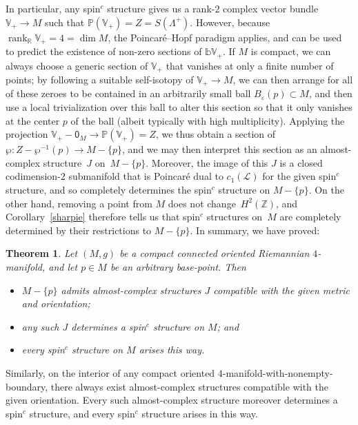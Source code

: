 \documentclass[pdftex]{sigma}
\numberwithin{equation}{section}
\newtheorem{Theorem}{Theorem}[section]
\def\ZZ{\mathbb{Z}}
\def\RR{\mathbb{R}}
\DeclareMathOperator{\rank}{rank}
\begin{document}
In particular, any spin$^c$ structure gives us a rank-$2$ complex vector bundle $\mathbb{V}_+\to M$ such that
$\mathbb{P} (\mathbb{V}_+)= Z = S (\Lambda^+)$. However, because $\rank_\RR \mathbb{V}_+= 4 = \dim M$,
the Poincar\'e--Hopf paradigm applies, and can be used to predict the existence of non-zero sections of $\mathbb{bV}_+$.
If $M$ is compact, we can always choose a generic section of $\mathbb{V}_+$ that vanishes at only a finite number of points;
by following a suitable self-isotopy of $\mathbb{V}_+\to M$,
we can then arrange for all of these zeroes to be contained in an arbitrarily small ball
$B_\varepsilon (p) \subset M$,
and then use a local trivialization over this ball to alter this section so that it only vanishes at the center $p$ of the ball
(albeit typically with high multiplicity). Applying the projection $\mathbb{V}_+- \mathsf{0}_M \to \mathbb{P} (\mathbb{V}_+)= Z$,
we thus obtain a section of $\wp\colon Z- \wp^{-1}(p) \to M -\{ p \}$, and we may then interpret this section as an almost-complex structure~$J$ on~$M -\{ p \}$. Moreover, the image of this $J$ is a closed codimension-$2$ submanifold that is Poincar\'e dual to $c_1(\mathscr{L})$
for the given spin$^c$ structure, and so completely determines the spin$^c$ structure on $M-\{ p \}$. On the other hand,
removing a point from $M$ does not change~$H^2(\ZZ)$, and Corollary~\ref{sharpie} therefore tells us that
spin$^c$ structures on~$M$ are completely determined by their restrictions to $M-\{ p \}$. In summary, we have proved:

\begin{Theorem}Let $(M, g)$ be a compact connected oriented Riemannian $4$-manifold, and let
${p}\in M$ be an arbitrary base-point. Then
\begin{itemize}\itemsep=0pt
\item $M- \{ p\}$ admits almost-complex structures $J$ compatible with
the given metric and orientation;
\item any such $J$ determines a spin$^c$ structure on $M$; and
\item every spin$^c$ structure on $M$ arises this way.
\end{itemize}
\end{Theorem}

Similarly, on the interior of any compact oriented
$4$-manifold-with-nonempty-boundary, there always
exist almost-complex structures compatible with the given orientation. Every
such almost-complex structure moreover determines a spin$^c$ structure, and every spin$^c$ structure arises in this way.
\end{document}
